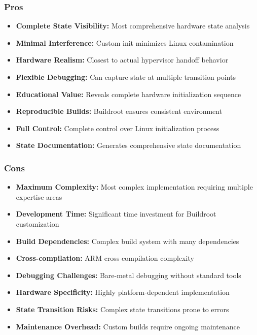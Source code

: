 \documentclass[11pt,a4paper]{article}
\begin{document}
\subsubsection{Pros}
\begin{itemize}
    \item \textbf{Complete State Visibility:} Most comprehensive hardware state analysis
    \item \textbf{Minimal Interference:} Custom init minimizes Linux contamination
    \item \textbf{Hardware Realism:} Closest to actual hypervisor handoff behavior
    \item \textbf{Flexible Debugging:} Can capture state at multiple transition points
    \item \textbf{Educational Value:} Reveals complete hardware initialization sequence
    \item \textbf{Reproducible Builds:} Buildroot ensures consistent environment
    \item \textbf{Full Control:} Complete control over Linux initialization process
    \item \textbf{State Documentation:} Generates comprehensive state documentation
\end{itemize}

\subsubsection{Cons}
\begin{itemize}
    \item \textbf{Maximum Complexity:} Most complex implementation requiring multiple expertise areas
    \item \textbf{Development Time:} Significant time investment for Buildroot customization
    \item \textbf{Build Dependencies:} Complex build system with many dependencies
    \item \textbf{Cross-compilation:} ARM cross-compilation complexity
    \item \textbf{Debugging Challenges:} Bare-metal debugging without standard tools
    \item \textbf{Hardware Specificity:} Highly platform-dependent implementation
    \item \textbf{State Transition Risks:} Complex state transitions prone to errors
    \item \textbf{Maintenance Overhead:} Custom builds require ongoing maintenance
\end{itemize}
\end{document}
